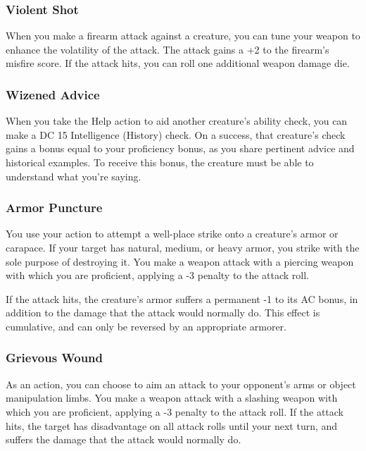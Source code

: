 \subsubsection{Violent Shot} \label{tec::violentshot}
When you make a firearm attack against a creature, you can tune your weapon to enhance the volatility of the attack.
The attack gains a +2 to the firearm's misfire score.
If the attack hits, you can roll one additional weapon damage die.

\subsubsection{Wizened Advice} \label{tec::wizenedadvice}
When you take the Help action to aid another creature's ability check, you can make a DC 15 Intelligence (History) check.
On a success, that creature's check gains a bonus equal to your proficiency bonus, as you share pertinent advice and historical examples.
To receive this bonus, the creature must be able to understand what you're saying.

\subsubsection{Armor Puncture} \label{tec::armorpuncture}
You use your action to attempt a well-place strike onto a creature's armor or carapace.
If your target has natural, medium, or heavy armor, you strike with the sole purpose of destroying it.
You make a weapon attack with a piercing weapon with which you are proficient, applying a -3 penalty to the attack roll.

If the attack hits, the creature's armor suffers a permanent -1 to its AC bonus, in addition to the damage that the attack would normally do.
This effect is cumulative, and can only be reversed by an appropriate armorer.

\subsubsection{Grievous Wound} \label{tec::grievouswound}
As an action, you can choose to aim an attack to your opponent's arms or object manipulation limbs.
You make a weapon attack with a slashing weapon with which you are proficient, applying a -3 penalty to the attack roll.
If the attack hits, the target has disadvantage on all attack rolls until your next turn, and suffers the damage that the attack would normally do.

